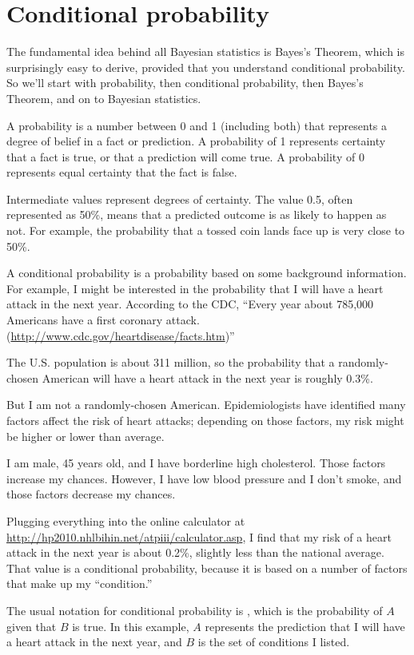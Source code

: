 \documentclass[12pt]{book}
\begin{document}
\section{Conditional probability}

The fundamental idea behind all Bayesian statistics is Bayes's Theorem,
which is surprisingly easy to derive, provided that you understand
conditional probability.  So we'll start with probability, then
conditional probability, then Bayes's Theorem, and on to Bayesian
statistics.

A probability is a number between 0 and 1 (including both) that
represents a degree of belief in a fact or prediction.  A probability
of 1 represents certainty that a fact is true, or that a prediction
will come true.  A probability of 0 represents equal certainty
that the fact is false.

Intermediate values represent degrees of certainty.  The value 0.5,
often represented as 50\%, means that a predicted outcome is
as likely to happen as not.  For example, the probability that a tossed
coin lands face up is very close to 50\%.

A conditional probability is a probability based on some background
information.  For example, I might be interested in the probability
that I will have a heart attack in the next year.  According to the
CDC, ``Every year about 785,000 Americans have a first coronary attack.
(\url{http://www.cdc.gov/heartdisease/facts.htm})''

The U.S. population is about 311 million, so the probability that a
randomly-chosen American will have a heart attack in the next year is
roughly 0.3\%.

But I am not a randomly-chosen American.  Epidemiologists have
identified many factors affect the risk of heart attacks; depending on
those factors, my risk might be higher or lower than average.

I am male, 45 years old, and I have
borderline high cholesterol.  Those factors increase my chances.
However, I have low blood pressure and I don't smoke, and
those factors decrease my chances.

Plugging everything into the online calculator at
\url{http://hp2010.nhlbihin.net/atpiii/calculator.asp}, I find that my
risk of a heart attack in the next year is about 0.2\%, slightly
less than the national average.
That value is a conditional probability, because it is based on
a number of factors that make up my ``condition.''

The usual notation for conditional probability is , which
is the probability of $A$ given that $B$ is true.  In this
example, $A$ represents the prediction that I will have a heart
attack in the next year, and $B$ is the set of conditions I listed.
\end{document}
